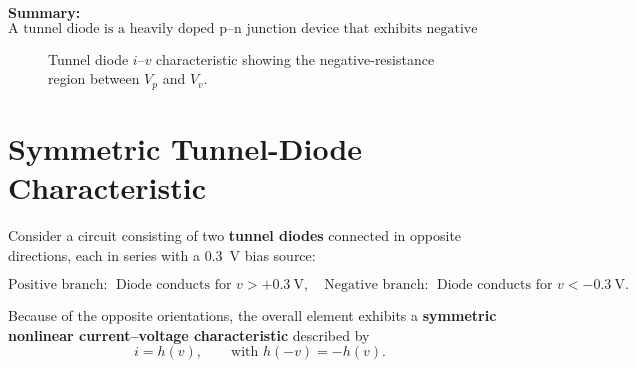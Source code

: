 \documentclass{article}
\begin{document}
\bigskip
\noindent
\textbf{Summary:}
\[
\boxed{
\text{A tunnel diode is a heavily doped p--n junction device that exhibits negative resistance due to quantum tunneling.}
}
\]
\begin{figure}[htbp]

\caption{Tunnel diode \(i\text{--}v\) characteristic showing the negative-resistance region between \(V_p\) and \(V_v\).}
\end{figure}
\section*{Symmetric Tunnel-Diode Characteristic}

Consider a circuit consisting of two \textbf{tunnel diodes} connected in opposite directions, 
each in series with a \SI{0.3}{V} bias source:

\[
\text{Positive branch: } \; \text{Diode conducts for } v > +0.3~\text{V}, \quad
\text{Negative branch: } \; \text{Diode conducts for } v < -0.3~\text{V}.
\]

Because of the opposite orientations, the overall element exhibits a 
\textbf{symmetric nonlinear current--voltage characteristic} described by
\[
i = h(v), \qquad \text{with } h(-v) = -h(v).
\]
\end{document}
